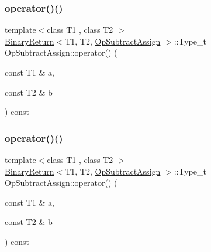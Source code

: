 \subsubsection{\texorpdfstring{operator()()}{operator()()}\hspace{0.1cm}{\footnotesize\ttfamily [1/3]}}
{\footnotesize\ttfamily template$<$class T1 , class T2 $>$ \\
\mbox{\hyperlink{structBinaryReturn}{Binary\+Return}}$<$T1, T2, \mbox{\hyperlink{structOpSubtractAssign}{Op\+Subtract\+Assign}} $>$\+::Type\+\_\+t Op\+Subtract\+Assign\+::operator() (\begin{DoxyParamCaption}\item[{const T1 \&}]{a,  }\item[{const T2 \&}]{b }\end{DoxyParamCaption}) const\hspace{0.3cm}{\ttfamily [inline]}}

\mbox{\label{structOpSubtractAssign_aad45a22054a0f7d5a0fd7c283e84661d}} 
\subsubsection{\texorpdfstring{operator()()}{operator()()}\hspace{0.1cm}{\footnotesize\ttfamily [2/3]}}
{\footnotesize\ttfamily template$<$class T1 , class T2 $>$ \\
\mbox{\hyperlink{structBinaryReturn}{Binary\+Return}}$<$T1, T2, \mbox{\hyperlink{structOpSubtractAssign}{Op\+Subtract\+Assign}} $>$\+::Type\+\_\+t Op\+Subtract\+Assign\+::operator() (\begin{DoxyParamCaption}\item[{const T1 \&}]{a,  }\item[{const T2 \&}]{b }\end{DoxyParamCaption}) const\hspace{0.3cm}{\ttfamily [inline]}}

\mbox{\label{structOpSubtractAssign_aad45a22054a0f7d5a0fd7c283e84661d}} 
